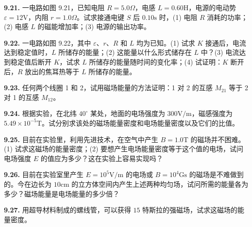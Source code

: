 \begin{center}
\end{center}

\vfill
\newpage

\textbf{9.21.} 一电路如图 9.21，已知电阻 $R = 5.0\Omega$，电感 $L = 0.60\mathrm{H}$，电源的电动势 $\varepsilon = 12\mathrm{V}$，内阻 $r = 1.0\Omega$。试求接通电键 $S$ 后 $0.10\mathrm{s}$ 时，(1) 电阻 $R$ 消耗的功率；(2) 电感 $L$ 的磁能增加率；(3) 电源的输出功率。

\begin{center}
\end{center}

\vfill
\newpage

\textbf{9.22.} 一电路如图 9.22，其中 $\varepsilon$、$r$、$R$ 和 $L$ 均为已知。(1) 试求 $K$ 接通后，电流达到稳定值时，$L$ 所储存的能量；(2) 这能量以什么形式储存在 $L$ 中？(3) 电流达到稳定值后断开 $K$，试求 $L$ 所储存的能量随时间的变化率；(4) 试证明：$K$ 断开后，$R$ 放出的焦耳热等于 $L$ 所储存的能量。

\begin{center}
\end{center}

\vfill
\newpage

\textbf{9.23.} 任何两个线圈 1 和 2，试用磁场能量的方法证明：1 对 2 的互感 $M_{21}$ 等于 2 对 1 的互感 $M_{12}$。

\vfill
\newpage

\textbf{9.24.} 根据实验，在北纬 $40^{\circ}$ 某处，地面的电场强度为 $300\mathrm{V/m}$，磁感强度为 $5.49 \times 10^{-5}\mathrm{T}$。试分别求该处的磁场能量密度和电场能量密度以及它们的比值。

\vfill
\newpage

\textbf{9.25.} 目前在实验里，利用先进技术，在空气中产生 $B = 1.0\mathrm{T}$ 的磁场并不困难。(1) 试求这磁场的能量密度；(2) 要想产生电场能量密度等于这个值的电场，试问电场强度 $E$ 的值应为多少？这在实验上容易实现吗？

\vfill
\newpage

\textbf{9.26.} 目前在实验室里产生 $E = 10^{5}\mathrm{V/m}$ 的电场或 $B = 10^{4}\mathrm{Gs}$ 的磁场是不难做到的。今在边长为 $10\mathrm{cm}$ 的立方体空间内产生上述两种均匀场，试问所需的能量各为多少？磁场能量是电场能量的多少倍？

\vfill
\newpage

\textbf{9.27.} 用超导材料制成的螺线管，可以获得 $15$ 特斯拉的强磁场，试求这磁场的能量密度。

